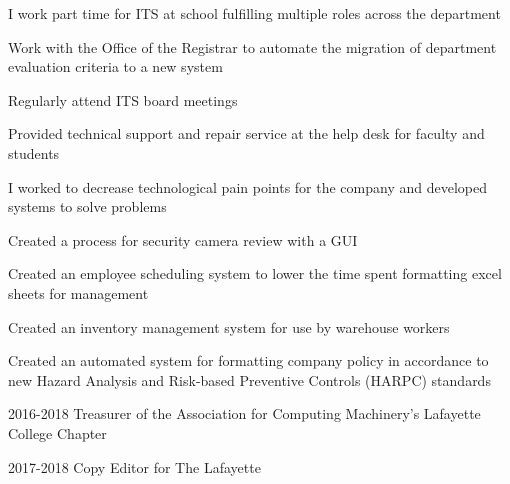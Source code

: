 \documentclass[letterpaper]{deedy-resume} %
\begin{document}
\begin{minipage}[t]{0.64\textwidth}
\sectionspace
I work part time for ITS at school fulfilling multiple roles across the department
\begin{tightitemize}
\item Work with the Office of the Registrar to automate the migration of department evaluation criteria to a new system
\item Regularly attend ITS board meetings
\item Provided technical support and repair service at the help desk for faculty and students
\end{tightitemize}
\sectionspace %


\sectionspace
I worked to decrease technological pain points for the company and developed systems to solve problems
\begin{tightitemize}
\item Created a process for security camera review with a GUI
\item Created an employee scheduling system to lower the time spent formatting excel sheets for management
\item Created an inventory management system for use by warehouse workers
\item Created an automated system for formatting company policy in accordance to new Hazard Analysis and Risk-based Preventive Controls (HARPC) standards
\end{tightitemize}
\sectionspace %



\descript{}
\begin{tightitemize}
\item 2016-2018 Treasurer of the Association for Computing Machinery's 
Lafayette College Chapter \\
\item 2017-2018 Copy Editor for The Lafayette 
\end{tightitemize}

\sectionspace
\end{minipage} %
\end{document}
